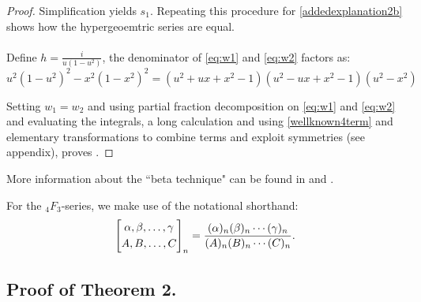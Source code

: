\documentclass[12pt]{article}
\begin{document}
\begin{proof}
\noindent Simplification yields $s_1$. Repeating this procedure for \eqref{addedexplanation2b} shows how the hypergeoemtric series are equal.  
 \\
 \\
 Define $h = \frac{i}{u(1-u^2)}$, the denominator of \eqref{eq:w1} and  \eqref{eq:w2} factors as:  
\begin{equation}\label{productforpartial}
 u^2(1-u^2)^2-x^2(1-x^2)^2=(u^2+ux+x^2-1)(u^2-ux+x^2-1)(u^2-x^2) 
\end{equation}

\noindent Setting $w_1=w_2$ and using partial fraction decomposition on \eqref{eq:w1} and  \eqref{eq:w2} and evaluating the integrals, a long  calculation and using \eqref{wellknown4term} and elementary transformations to combine terms and exploit symmetries (see appendix), proves .   
\end{proof}

\noindent \dag More information about the ``beta technique" can be found in \cite{Batir2005} and \cite{Hakimoglupreprint} .

\noindent \ddag For the  ${}_{4}F_{3}$-series, we make use of the notational shorthand: 
\begin{equation*}
 \left[ \begin{matrix} \alpha, \beta, \ldots, \gamma \vspace{1mm} \\ 
 A, B, \ldots, C \end{matrix} \right]_{n} = \frac{ (\alpha)_{n} (\beta)_{n} 
 \cdots (\gamma)_{n} }{ (A)_{n} (B)_{n} \cdots (C)_{n}}. 
\end{equation*}





\subsection{Proof of Theorem 2.}
\end{document}
